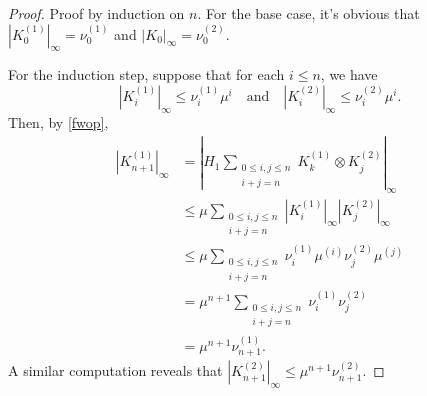 \documentclass[a4paper, 12pt]{article}
\begin{document}
\begin{proof}
	Proof by induction on $n$.
	For the base case, it's obvious that $\left| K_{0}^{(1)} \right|_{\infty} = \nu_{0}^{(1)}$ and $\left| K_{0} \right|_{\infty}= \nu_0^{(2)}$.

	For the induction step, suppose that for each $i\le n$, we have
\[
	\left| K_{i}^{(1)} \right|_{\infty} \le \nu_{i}^{(1)}\mu^{i}
	\quad \text{and} \quad
	\left| K_{i}^{(2)} \right|_{\infty} \le \nu_{i}^{(2)}\mu^{i}
	.\]
	Then, by \cref{fwop},
	\begin{align*}
		\left| K_{n + 1}^{(1)} \right|_{\infty}
		&= \left| H_1 \sum_{\substack{0\le i,j\le n\\i + j = n}} K_{k}^{(1)}\otimes K_{j}^{(2)}\right|_{\infty} \\
		&\le \mu \sum_{\substack{0\le i,j\le n\\i + j = n}} \left| K_{i}^{(1)} \right|_{\infty}\left| K_{j}^{(2)} \right|_{\infty} \\
		&\le \mu \sum_{\substack{0\le i,j\le n\\i + j = n}}\nu_{i}^{(1)}\mu^{(i)} \nu_{j}^{(2)}\mu^{(j)} \\
		&= \mu^{n + 1} \sum_{\substack{0\le i,j\le n\\i + j = n}}\nu_{i}^{(1)}\nu_{j}^{(2)}\\
		&= \mu^{n + 1}\nu_{n + 1}^{(1)}
	.\end{align*}
	A similar computation reveals that $\left| K_{n + 1}^{(2)} \right|_{\infty}\le \mu^{n + 1}\nu_{n + 1}^{(2)}$.
\end{proof}

\iffalse
Using the previous lemma, we can bound the forward operators. First, we define 
\begin{equation}\label{nu}
	\nu_{n} \coloneqq \left[\left(\nu_{n}^{(1)}\right)^2 + \left(\nu_{n}^{(2)}\right)^2 \right]^{1/2}
.\end{equation} 
\begin{cor}
	The forward operators $K_n$ are bounded multilinear operators from $\left[ L^{\infty}\left( \Omega \right) \right]^{n}$ to $C\left( \pp{\Omega}\times \pp{\Omega} \right)^2$ that satisfy
	\[
	\lVert K_{n} \rVert= \lVert \begin{pmatrix} \left| K_{n}^{(1)} \right|_{\infty}\\\left| K_{n}^{(2)} \right|_{_{\infty}} \end{pmatrix} \rVert \le \nu_{n}\mu^{n}  
	.\] 
\end{cor}
\fi
\end{document}
